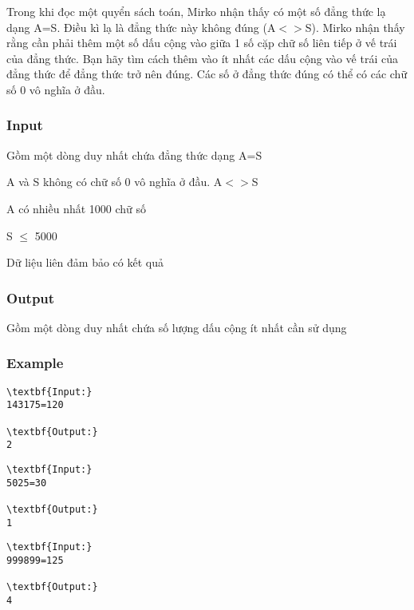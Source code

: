 







   Trong khi đọc một quyển sách toán, Mirko nhận thấy có một số đẳng thức lạ dạng A=S. Điều kì lạ là đẳng thức này không đúng (A$<$$>$S). Mirko nhận thấy rằng cần phải thêm một số dấu cộng vào giữa 1 số cặp chữ số liên tiếp ở vế trái của đẳng thức. Bạn hãy tìm cách thêm vào ít nhất các dấu cộng vào vế trái của đẳng thức để đẳng thức trở nên đúng. Các số ở đẳng thức đúng có thể có các chữ số 0 vô nghĩa ở đầu.  

\subsubsection{   Input  }

   Gồm một dòng duy nhất chứa đẳng thức dạng A=S  

   A và S không có chữ số 0 vô nghĩa ở đầu. A$<$$>$S  

   A có nhiều nhất 1000 chữ số  

   S $\le$ 5000  

   Dữ liệu liên đảm bảo có kết quả  

\subsubsection{   Output  }

   Gồm một dòng duy nhất chứa số lượng dấu cộng ít nhất cần sử dụng  

\subsubsection{   Example  }
\begin{verbatim}
\textbf{Input:}
143175=120

\textbf{Output:}
2
\end{verbatim}
\begin{verbatim}
\textbf{Input:}
5025=30

\textbf{Output:}
1
\end{verbatim}
\begin{verbatim}
\textbf{Input:}
999899=125

\textbf{Output:}
4
\end{verbatim}

